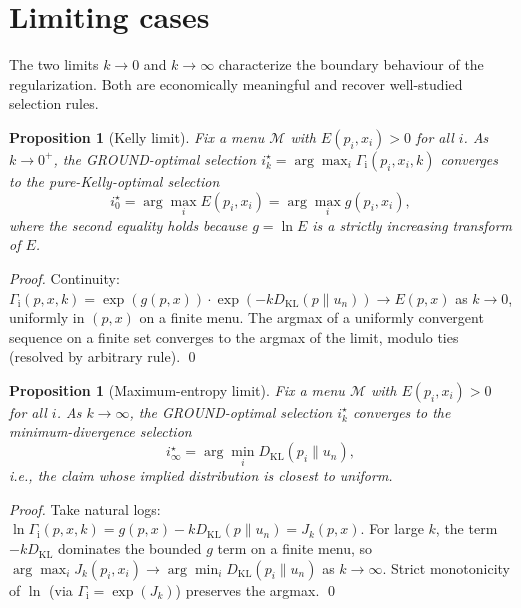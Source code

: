 \documentclass[11pt]{article}
\newtheorem{proposition}[theorem]{Proposition}
\theoremstyle{definition}
\theoremstyle{remark}
\newcommand{\G}{g}
\newcommand{\KL}{D_{\mathrm{KL}}}
\newcommand{\GROUND}{\Gamma_{\mathrm{i}}}
\begin{document}
\section{Limiting cases}\label{sec:limits}

The two limits $k \to 0$ and $k \to \infty$ characterize the boundary
behaviour of the regularization. Both are economically meaningful and
recover well-studied selection rules.

\begin{proposition}[Kelly limit]\label{prop:kelly-limit}
Fix a menu $\mathcal{M}$ with $E(p_i, x_i) > 0$ for all $i$. As
$k \to 0^+$, the GROUND-optimal selection $i^\star_k = \arg\max_i
\GROUND(p_i, x_i, k)$ converges to the pure-Kelly-optimal selection
\begin{equation*}
i^\star_0 = \arg\max_i E(p_i, x_i) = \arg\max_i \G(p_i, x_i),
\end{equation*}
where the second equality holds because $\G = \ln E$ is a strictly
increasing transform of $E$.
\end{proposition}

\begin{proof}
Continuity: $\GROUND(p, x, k) = \exp(\G(p, x)) \cdot \exp(-k \KL(p\|u_n))
\to E(p, x)$ as $k \to 0$, uniformly in $(p, x)$ on a finite menu.
The argmax of a uniformly convergent sequence on a finite set
converges to the argmax of the limit, modulo ties (resolved by
arbitrary rule).
\qed
\end{proof}

\begin{proposition}[Maximum-entropy limit]\label{prop:maxent-limit}
Fix a menu $\mathcal{M}$ with $E(p_i, x_i) > 0$ for all $i$. As
$k \to \infty$, the GROUND-optimal selection $i^\star_k$ converges to
the minimum-divergence selection
\begin{equation*}
i^\star_\infty = \arg\min_i \KL(p_i \| u_n),
\end{equation*}
i.e., the claim whose implied distribution is closest to uniform.
\end{proposition}

\begin{proof}
Take natural logs: $\ln \GROUND(p, x, k) = \G(p, x) - k \KL(p \| u_n) = J_k(p, x)$.
For large $k$, the term $-k \KL$ dominates the bounded $\G$ term on
a finite menu, so $\arg\max_i J_k(p_i, x_i) \to \arg\min_i
\KL(p_i \| u_n)$ as $k \to \infty$. Strict monotonicity of $\ln$
(via $\GROUND = \exp(J_k)$) preserves the argmax. \qed
\end{proof}
\end{document}

